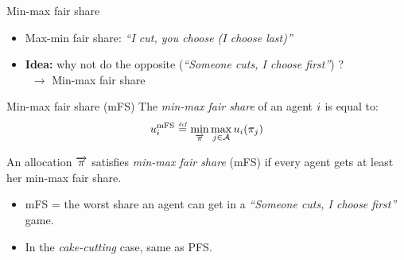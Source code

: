 \documentclass[9pt,english]{beamer}
\begin{document}
\begin{frame}{Min-max fair share}
  \begin{itemize}
  \item Max-min fair share: \textit{``I cut, you choose (I choose last)''}\pause
  \item \textbf{Idea:} why not do the opposite (\textit{``Someone
      cuts, I choose first''}) ?\\
    \ \hfill $\to$ Min-max fair share
  \end{itemize}

  \pause\vfill

  \begin{block}{Min-max fair share (mFS)}
    The \emph{min-max fair share} of an agent $i$ is equal to:
    \[
    \umFS_\ag  \Def \min_{\Shares} \max_{\agp \in \Agents } u_\ag(\share_{\agp})
    \]
    
    An allocation $\overrightarrow{\pi}$ satisfies \emph{min-max fair share}
    (mFS) if every agent gets at least her min-max fair share.
  \end{block}    

  \pause\vfill

  \begin{itemize}
  \item mFS = the worst share an agent can get in a \textit{``Someone
      cuts, I choose first''} game.
  \item In the \emph{cake-cutting} case, same as PFS.
  \end{itemize}
\end{frame}
\end{document}
